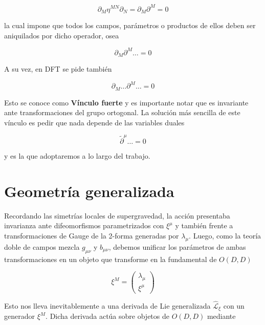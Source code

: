 \documentclass{article}
\numberwithin{equation}{section}
\begin{document}
\begin{equation}\label{key}
\partial_M\eta^{MN}\partial_N= \partial_M\partial^M = 0
\end{equation}

la cual impone que todos los campos, parámetros o productos de ellos deben ser aniquilados por dicho operador, osea

\begin{equation}\label{key}
\partial_M\partial^M \dots = 0
\end{equation}

A su vez, en DFT se pide también 

\begin{equation}\label{SC2}
\partial_M\dots\partial^M \dots = 0
\end{equation}

Esto se conoce como \textbf{Vínculo fuerte} y es importante notar que es invariante ante transformaciones del grupo ortogonal. La solución más sencilla de este vínculo es pedir que nada depende de las variables duales 

\begin{equation}\label{SC3}
\widetilde{\partial}^{\mu} \dots =0
\end{equation}

y es la que adoptaremos a lo largo del trabajo.


\section{Geometría generalizada}\label{sec_geometriageneralizada}

Recordando las simetrías locales de supergravedad, la acción presentaba invarianza ante difeomorfismos parametrizados con $ \xi^{\mu} $ y también frente a transformaciones de Gauge de la 2-forma generadas por $ \lambda_{\mu} $. Luego, como la teoría doble de campos mezcla $ g_{\mu\nu} $ y $ b_{\mu\nu} $, debemos unificar los parámetros de ambas transformaciones en un objeto que transforme en la fundamental de $ O(D,D) $

\begin{equation}\label{key}
\xi^M=
\begin{pmatrix}
\lambda_{\mu}\\
\xi^{\mu}
\end{pmatrix}
\end{equation} 

Esto nos lleva inevitablemente a una derivada de Lie generalizada $ \hat{\mathcal{L}}_{\xi} $ con un generador $ \xi^M $. Dicha derivada actúa sobre objetos de $ O(D,D) $ mediante
\end{document}
